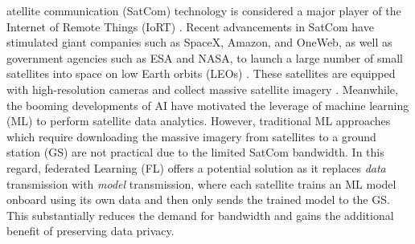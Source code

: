 \documentclass[letter,journal]{IEEEtran}
\begin{document}
atellite communication (SatCom) technology is considered a major player of the Internet of Remote Things (IoRT) \cite{OliveBranch}. Recent advancements in SatCom have stimulated giant companies such as SpaceX, Amazon, and OneWeb, as well as government agencies such as ESA and NASA, to launch a large number of small satellites into space on low Earth orbits (LEOs) \cite{pachler2021updated}. These satellites are equipped with high-resolution cameras and collect massive satellite imagery \cite{zhai2023fedleo }. Meanwhile, the booming developments of AI have motivated the leverage of machine learning (ML) to perform satellite data analytics. However, traditional ML approaches which require downloading the massive imagery from satellites to a ground station (GS) are not practical due to the limited SatCom bandwidth. In this regard, federated Learning (FL) \cite{mcmahan2017communication, xie2020asynchronous} offers a potential solution as it replaces {\em data} transmission with {\em model} transmission, where each satellite trains an ML model onboard using its own data and then only sends the trained model to the GS. This substantially reduces the demand for bandwidth and gains the additional benefit of preserving data privacy.

\end{document}
